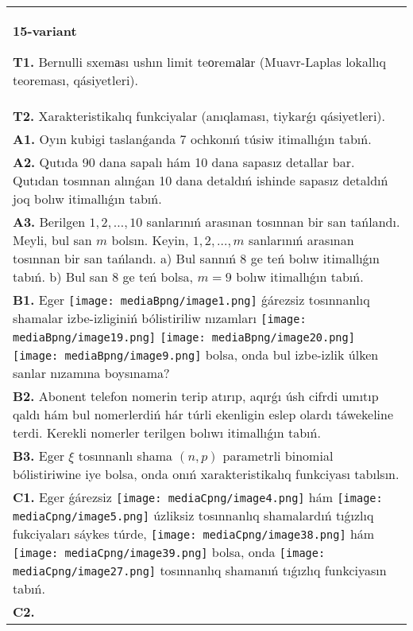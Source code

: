 \documentclass{article}
\begin{document}
\begin{tabular}{m{17cm}}
\textbf{15-variant}
\newline

\textbf{T1.} Bernulli sxemаsı ushın limit teоremаlаr (Muavr-Laplas lokallıq teoreması, qásiyetleri).
 \\
\textbf{T2.} Xarakteristikalıq funkciyalar (anıqlaması, tiykarǵı qásiyetleri).
 \\
\textbf{A1.} Oyın kubigi taslanǵanda 7 ochkonıń túsiw itimallıǵın tabıń.
 \\
\textbf{A2.} Qutıda 90 dana sapalı hám 10 dana sapasız detallar bar. Qutıdan tosınnan alınǵan 10 dana detaldıń ishinde sapasız detaldıń joq bolıw itimallıǵın tabıń.
 \\
\textbf{A3.} Berilgen $1,2,\ldots ,10$ sanlarınıń arasınan tosınnan bir san tańlandı. Meyli, bul san $m$ bolsın. Keyin, $1,2,\ldots ,m$ sanlarınıń arasınan tosınnan bir san tańlandı. a) Bul sannıń 8 ge teń bolıw itimallıǵın tabıń. b) Bul san 8 ge teń bolsa, $m=9$ bolıw itimallıǵın tabıń.
 \\
\textbf{B1.} Eger \texttt{[image: mediaBpng/image1.png]} ǵárezsiz tosınnanlıq shamalar izbe-izliginiń bólistiriliw nızamları
\texttt{[image: mediaBpng/image19.png]} \texttt{[image: mediaBpng/image20.png]} \texttt{[image: mediaBpng/image9.png]}
bolsa, onda bul izbe-izlik úlken sanlar nızamına boysınama?
 \\
\textbf{B2.} Abonent telefon nomerin terip atırıp, aqırǵı úsh cifrdi umıtıp qaldı hám bul nomerlerdiń hár túrli ekenligin eslep olardı táwekeline terdi. Kerekli nomerler terilgen bolıwı itimallıǵın tabıń.
 \\
\textbf{B3.} Eger \(\xi\) tosınnanlı shama \((n,p)\) parametrli binomial bólistiriwine iye bolsa, onda onıń xarakteristikalıq funkciyası tabılsın.
 \\
\textbf{C1.} Eger ǵárezsiz \texttt{[image: mediaCpng/image4.png]} hám \texttt{[image: mediaCpng/image5.png]} úzliksiz tosınnanlıq shamalardıń tıǵızlıq fukciyaları sáykes túrde,
\texttt{[image: mediaCpng/image38.png]} hám \texttt{[image: mediaCpng/image39.png]}
bolsa, onda \texttt{[image: mediaCpng/image27.png]} tosınnanlıq shamanıń tıǵızlıq funkciyasın tabıń.
 \\
\textbf{C2.} 

\end{tabular}
\end{document}
